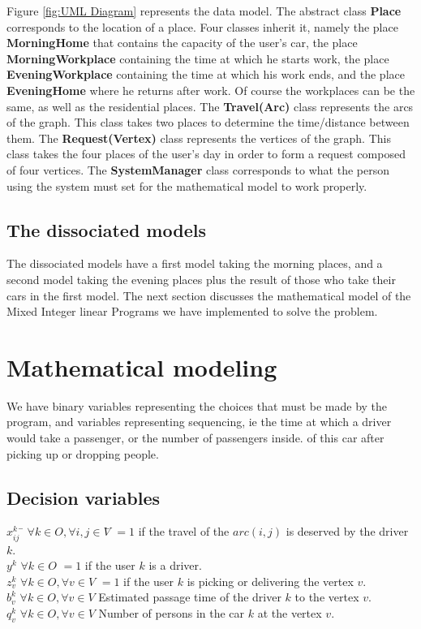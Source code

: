 \documentclass[12pt, a4paper, twoside]{memoir}
\newcommand{\newpar}{\vskip 0.2in \noindent}
\newcommand\tab[1][1cm]{\hspace*{#1}}
\begin{document}
{	\noindent Figure \ref{fig:UML Diagram} represents the data model. \newline
	The abstract class \textbf{Place} corresponds to the location of a place. Four classes inherit it, namely the place \textbf{MorningHome} that contains the capacity of the user's car, the place \textbf{MorningWorkplace} containing the time at which he starts work, the place \textbf{EveningWorkplace} containing the time at which his work ends, and the place \textbf{EveningHome} where he returns after work. Of course the workplaces can be the same, as well as the residential places. The \textbf{Travel(Arc)} class represents the arcs of the graph. This class takes two places to determine the time/distance between them. The \textbf{Request(Vertex)} class represents the vertices of the graph. This class takes the four places of the user's day in order to form a request composed of four vertices. The \textbf{SystemManager} class corresponds to what the person using the system must set for the mathematical model to work properly.
	
	\subsection{The dissociated models}
	
	The dissociated models have a first model taking the morning places, and a second model taking the evening places plus the result of those who take their cars in the first model.
	\newpar
	The next section discusses the mathematical model of the Mixed Integer linear Programs we have implemented to solve the problem.
	
	\section{Mathematical modeling}
	
	We have binary variables representing the choices that must be made by the program, and variables representing sequencing, ie the time at which a driver would take a passenger, or the number of passengers inside. of this car after picking up or dropping people.
	
	\subsection{Decision variables}
	\begin{tabbing}
		$x^{k}_{ij}$ \tab \= $\forall k\in O, \forall i, j\in V$\tab \= $=1$ if the travel of the $arc(i, j)$ is deserved by the driver $k$. \\
		$y^{k}$ \> $\forall k\in O$ \> $=1$ if the user $k$ is a driver. \\
		$z^{k}_{v}$ \> $\forall k\in O, \forall v\in V$ \> $=1$ if the user $k$ is picking or delivering the vertex $v$. \\
		$b^{k}_{v}$ \> $\forall k\in O, \forall v\in V$ \> Estimated passage time of the driver $k$ to the vertex $v$. \\
		$q^{k}_{v}$ \> $\forall k\in O, \forall v\in V$ \> Number of persons in the car $k$ at the vertex $v$. \\
	\end{tabbing}
	
}
\end{document}
